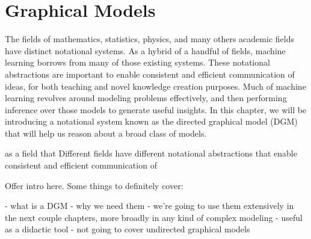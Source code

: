 \chapter{Graphical Models}
The fields of mathematics, statistics, physics, and many others academic fields have distinct notational systems. As a hybrid of a handful of fields, machine learning borrows from many of those existing systems. These notational abstractions are important to enable consistent and efficient communication of ideas, for both teaching and novel knowledge creation purposes. Much of machine learning revolves around modeling problems effectively, and then performing inference over those models to generate useful insights. In this chapter, we will be introducing a notational system known as the directed graphical model (DGM) that will help us reason about a broad class of models.

 as a field that Different fields have different notational abstractions that enable consistent and efficient communication of 

Offer intro here. Some things to definitely cover:

- what is a DGM
- why we need them
- we're going to use them extensively in the next couple chapters, more broadly in any kind of complex modeling
- useful as a didactic tool
- not going to cover undirected graphical models

